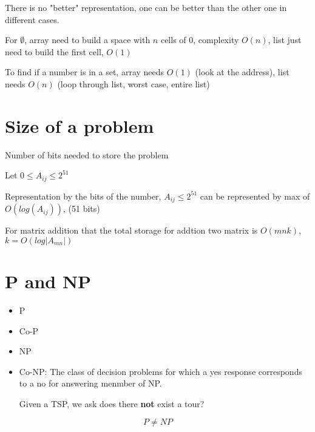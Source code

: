 			There is no "better" representation, one can be better than the other one in different cases.

			\begin{example}	
				For $\emptyset$, array need to build a space with $n$ cells of 0, complexity $O(n)$, list just need to build the first cell, $O(1)$
			\end{example}

			\begin{example}
				To find if a number is in a set, array needs $O(1)$ (look at the address), list needs $O(n)$ (loop through list, worst case, entire list)
			\end{example}

		\section{Size of a problem}
			Number of bits needed to store the problem

			\begin{example}
				Let $0 \le A_{ij} \le 2^{51}$
			\end{example}

			Representation by the bits of the number, $A_{ij} \le 2^51$ can be represented by max of $O(log(A_{ij}))$, (51 bits)

			For matrix addition that the total storage for addtion two matrix is $O(mnk)$, $k=O(log|A_{mn}|)$

		\section{P and NP}
			\begin{itemize}
				\item P
				\item Co-P
				\item NP
				\item Co-NP: The class of decision problems for which a yes response corresponds to a no for answering menmber of NP.
				\begin{example}
					Given a TSP, we ask does there \textbf{not} exist a tour?
				\end{example}
			\end{itemize}

			\begin{conjecture}
				\begin{equation}
					P \ne NP
				\end{equation}
			\end{conjecture}

